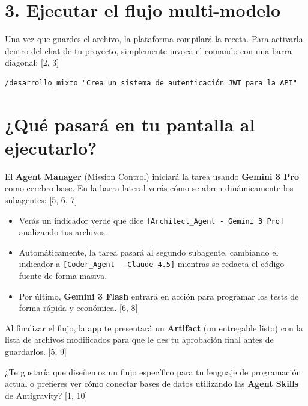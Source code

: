 \documentclass[12pt, a4paper]{article}
\begin{document}
\section*{3. Ejecutar el flujo multi-modelo}

Una vez que guardes el archivo, la plataforma compilará la receta. Para activarla dentro del chat de tu proyecto, simplemente invoca el comando con una barra diagonal: [2, 3]

\begin{verbatim}
/desarrollo_mixto "Crea un sistema de autenticación JWT para la API"
\end{verbatim}

\section*{¿Qué pasará en tu pantalla al ejecutarlo?}

El \textbf{Agent Manager} (Mission Control) iniciará la tarea usando \textbf{Gemini 3 Pro} como cerebro base. En la barra lateral verás cómo se abren dinámicamente los subagentes: [5, 6, 7]

\begin{itemize}
    \item Verás un indicador verde que dice \texttt{[Architect\_Agent - Gemini 3 Pro]} analizando tus archivos.
    \item Automáticamente, la tarea pasará al segundo subagente, cambiando el indicador a \texttt{[Coder\_Agent - Claude 4.5]} mientras se redacta el código fuente de forma masiva.
    \item Por último, \textbf{Gemini 3 Flash} entrará en acción para programar los tests de forma rápida y económica. [6, 8]
\end{itemize}

Al finalizar el flujo, la app te presentará un \textbf{Artifact} (un entregable listo) con la lista de archivos modificados para que le des tu aprobación final antes de guardarlos. [5, 9]

¿Te gustaría que diseñemos un flujo específico para tu lenguaje de programación actual o prefieres ver cómo conectar bases de datos utilizando las \textbf{Agent Skills} de Antigravity? [1, 10]
\end{document}
